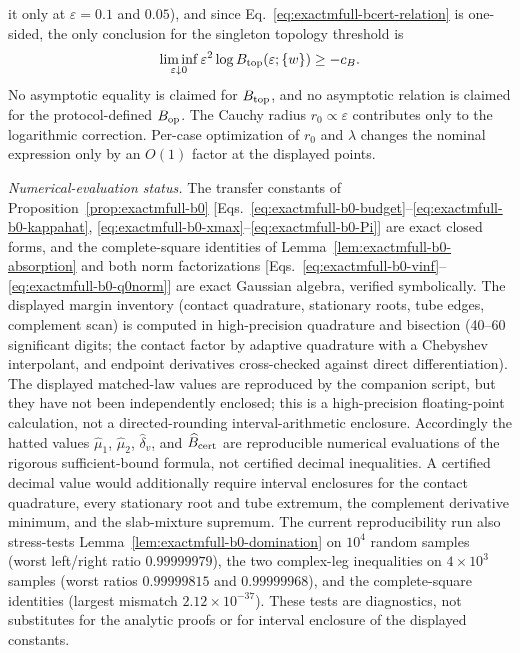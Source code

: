 \begin{remark}
it only at \(\varepsilon=0.1\) and \(0.05\)), and since
Eq.~\eqref{eq:exactmfull-bcert-relation} is one-sided, the only conclusion
for the singleton topology threshold is
\begin{equation*}
 \liminf_{\varepsilon\downarrow0}
 \varepsilon^2\log B_{\rm top}(\varepsilon;\{w\})\ge-c_B.
\end{equation*}
No asymptotic equality is claimed for \(B_{\rm top}\), and no asymptotic
relation is claimed for the protocol-defined \(B_{\rm op}\).  The Cauchy
radius \(r_0\propto\varepsilon\) contributes only to the logarithmic
correction.  Per-case optimization of \(r_0\) and \(\lambda\) changes the
nominal expression only by an \(O(1)\) factor at the displayed points.

\emph{Numerical-evaluation status.}  The transfer constants of
Proposition~\ref{prop:exactmfull-b0}
[Eqs.~\eqref{eq:exactmfull-b0-budget}--\eqref{eq:exactmfull-b0-kappahat},
\eqref{eq:exactmfull-b0-xmax}--\eqref{eq:exactmfull-b0-Pi}] are exact
closed forms, and the complete-square identities of
Lemma~\ref{lem:exactmfull-b0-absorption} and both norm factorizations
[Eqs.~\eqref{eq:exactmfull-b0-vinf}--\eqref{eq:exactmfull-b0-q0norm}] are
exact Gaussian algebra, verified symbolically.  The displayed margin inventory
(contact quadrature, stationary roots, tube edges, complement scan) is
computed in high-precision quadrature and bisection (40--60 significant
digits; the contact factor by adaptive quadrature with a Chebyshev
interpolant, and endpoint derivatives cross-checked against direct
differentiation).  The displayed matched-law values are reproduced by the
companion script, but they have not been independently enclosed; this is a
high-precision floating-point calculation, not a directed-rounding
interval-arithmetic enclosure.  Accordingly the hatted values
\(\widehat\mu_1\), \(\widehat\mu_2\), \(\widehat\delta_v\), and
\(\widehat B_{\rm cert}\) are reproducible numerical evaluations of the
rigorous sufficient-bound formula, not certified decimal inequalities.  A
certified decimal value would additionally require interval enclosures for
the contact quadrature, every stationary root and tube extremum, the
complement derivative minimum, and the slab-mixture supremum.
The current reproducibility run also stress-tests
Lemma~\ref{lem:exactmfull-b0-domination} on \(10^4\) random samples
(worst left/right ratio \(0.99999979\)), the two complex-leg inequalities
on \(4\times10^3\) samples (worst ratios \(0.99999815\) and
\(0.99999968\)), and the complete-square identities (largest mismatch
\(2.12\times10^{-37}\)).  These tests are diagnostics, not substitutes for
the analytic proofs or for interval enclosure of the displayed constants.
\end{remark}
